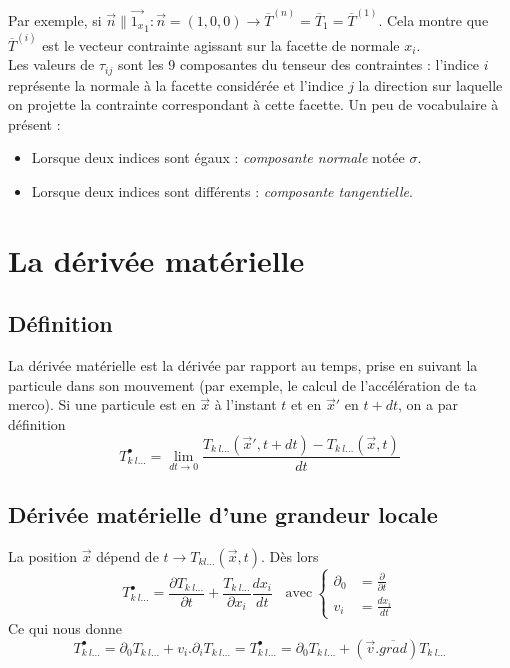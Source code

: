     \newpage
    Par exemple, si $\vec{n} \parallel \vec{1_x}_{1} : \vec{n} = (1,0,0) \rightarrow  \overline{T}^{(n)} =
     \overline{T}_1 =  \overline{T}^{(1)}$. Cela montre que $ \overline{T}^{(i)}$ est le vecteur contrainte
     agissant sur la facette de normale $x_i$.\\
     
     Les valeurs de $\tau_{ij}$ sont les 9 composantes du tenseur des contraintes : l'indice $i$ représente
     la normale à la facette considérée et l'indice $j$ la direction sur laquelle on projette la contrainte
     correspondant à cette facette. Un peu de vocabulaire à présent :
     \begin{itemize}
     \item Lorsque deux indices sont égaux : \textit{composante normale} notée $\sigma$.
     \item Lorsque deux indices sont différents : \textit{composante tangentielle}.
     \end{itemize}
    
    
    
    
\section{La dérivée matérielle}
    \subsection{Définition}
    La dérivée matérielle est la dérivée par rapport au temps, prise en suivant la particule dans son 
    mouvement (par exemple, le calcul de l'accélération de ta merco). Si une particule est en $\vec{x}$
    à l'instant $t$ et en $\vec{x}'$ en $t+dt$, on a par définition
    \begin{equation}
    T_{k\ l\dots}^\bullet = \lim\limits_{dt \rightarrow 0} \dfrac{T_{k\ l\dots}(\vec{x}',t+dt) - T_{k\ l\dots}
    (\vec x,t)}{dt}
    \end{equation}
    
    \subsection{Dérivée matérielle d'une grandeur locale}
    La position $\vec{x}$ dépend de $t \rightarrow T_{kl\dots} (\vec{x},t)$. Dès lors
    \begin{equation}
    T_{k\ l\dots}^\bullet = \frac{\partial T_{k\ l\dots}}{\partial t} + \frac{T_{k\ l\dots}}{\partial x_i}
    \frac{dx_i}{dt}\ \ \ \ \text{avec}\ \left\{\begin{array}{ll}
    \partial_0 &= \frac{\partial}{\partial t}  \\
    v_i &= \frac{dx_i}{dt} 
    \end{array}\right.
    \end{equation}
    Ce qui nous donne 
    \begin{equation}
    T_{k\ l\dots}^\bullet = \partial_0T_{k\ l\dots} + v_i.\partial_iT_{k\ l\dots} = T_{k\ l\dots}^\bullet = \partial_0T_{k\ l\dots} +
    (\vec v.\overline{grad})T_{k\ l\dots}
    \end{equation}
    
